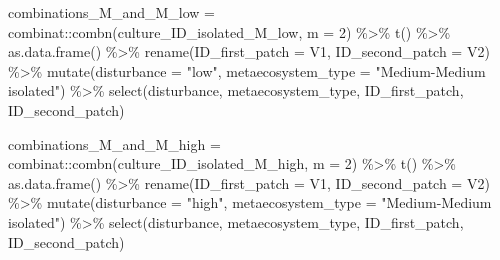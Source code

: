\documentclass[
]{article}
\newenvironment{Shaded}{\begin{snugshade}}{\end{snugshade}}
\newcommand{\AttributeTok}[1]{\textcolor[rgb]{0.77,0.63,0.00}{#1}}
\newcommand{\DecValTok}[1]{\textcolor[rgb]{0.00,0.00,0.81}{#1}}
\newcommand{\FunctionTok}[1]{\textcolor[rgb]{0.00,0.00,0.00}{#1}}
\newcommand{\NormalTok}[1]{#1}
\newcommand{\OtherTok}[1]{\textcolor[rgb]{0.56,0.35,0.01}{#1}}
\newcommand{\SpecialCharTok}[1]{\textcolor[rgb]{0.00,0.00,0.00}{#1}}
\newcommand{\StringTok}[1]{\textcolor[rgb]{0.31,0.60,0.02}{#1}}
\begin{document}
\begin{Shaded}
\begin{Highlighting}[]
\NormalTok{combinations\_M\_and\_M\_low }\OtherTok{=}\NormalTok{ combinat}\SpecialCharTok{::}\FunctionTok{combn}\NormalTok{(culture\_ID\_isolated\_M\_low,}
                                   \AttributeTok{m =} \DecValTok{2}\NormalTok{) }\SpecialCharTok{\%\textgreater{}\%}
                            \FunctionTok{t}\NormalTok{() }\SpecialCharTok{\%\textgreater{}\%}
                            \FunctionTok{as.data.frame}\NormalTok{() }\SpecialCharTok{\%\textgreater{}\%}
                            \FunctionTok{rename}\NormalTok{(}\AttributeTok{ID\_first\_patch =}\NormalTok{ V1,}
                                   \AttributeTok{ID\_second\_patch =}\NormalTok{ V2) }\SpecialCharTok{\%\textgreater{}\%}
                            \FunctionTok{mutate}\NormalTok{(}\AttributeTok{disturbance =} \StringTok{"low"}\NormalTok{,}
                                   \AttributeTok{metaecosystem\_type =} \StringTok{"Medium{-}Medium isolated"}\NormalTok{) }\SpecialCharTok{\%\textgreater{}\%}
                            \FunctionTok{select}\NormalTok{(disturbance,}
\NormalTok{                                   metaecosystem\_type,}
\NormalTok{                                   ID\_first\_patch,}
\NormalTok{                                   ID\_second\_patch)}

\NormalTok{combinations\_M\_and\_M\_high }\OtherTok{=}\NormalTok{ combinat}\SpecialCharTok{::}\FunctionTok{combn}\NormalTok{(culture\_ID\_isolated\_M\_high,}
                                   \AttributeTok{m =} \DecValTok{2}\NormalTok{) }\SpecialCharTok{\%\textgreater{}\%}
                            \FunctionTok{t}\NormalTok{() }\SpecialCharTok{\%\textgreater{}\%}
                            \FunctionTok{as.data.frame}\NormalTok{() }\SpecialCharTok{\%\textgreater{}\%}
                            \FunctionTok{rename}\NormalTok{(}\AttributeTok{ID\_first\_patch =}\NormalTok{ V1,}
                                   \AttributeTok{ID\_second\_patch =}\NormalTok{ V2) }\SpecialCharTok{\%\textgreater{}\%}
                            \FunctionTok{mutate}\NormalTok{(}\AttributeTok{disturbance =} \StringTok{"high"}\NormalTok{,}
                                   \AttributeTok{metaecosystem\_type =} \StringTok{"Medium{-}Medium isolated"}\NormalTok{) }\SpecialCharTok{\%\textgreater{}\%}
                            \FunctionTok{select}\NormalTok{(disturbance,}
\NormalTok{                                   metaecosystem\_type,}
\NormalTok{                                   ID\_first\_patch,}
\NormalTok{                                   ID\_second\_patch)}


\end{Highlighting}
\end{Shaded}
\end{document}
